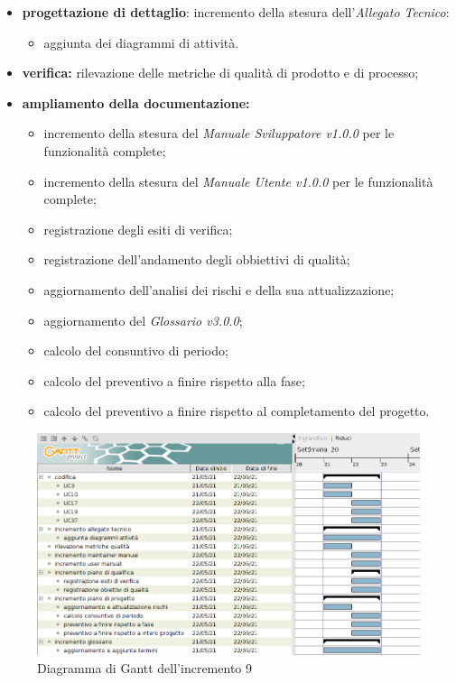 \begin{itemize}
\begin{itemize}
\begin{itemize}
                    \end{itemize}
          \end{itemize}
    \item \textbf{progettazione di dettaglio}: incremento della stesura dell'\textit{Allegato Tecnico}:
          \begin{itemize}
              \item aggiunta dei diagrammi di attività.
          \end{itemize}
    \item \textbf{verifica:} rilevazione delle metriche di qualità di prodotto e di processo;
    \item \textbf{ampliamento della documentazione:}
          \begin{itemize}
              \item incremento della stesura del \textit{Manuale Sviluppatore v1.0.0} per le funzionalità complete;
              \item incremento della stesura del \textit{Manuale Utente v1.0.0} per le funzionalità complete;
              \item registrazione degli esiti di verifica;
              \item registrazione dell'andamento degli obbiettivi di qualità;
              \item aggiornamento dell'analisi dei rischi e della sua attualizzazione;
              \item aggiornamento del \textit{Glossario v3.0.0};
              \item calcolo del consuntivo di periodo;
              \item calcolo del preventivo a finire rispetto alla fase;
              \item calcolo del preventivo a finire rispetto al completamento del progetto.
          \end{itemize}
\end{itemize}
\begin{figure}[!ht]
    \caption{Diagramma di Gantt dell'incremento 9}
    \vspace{5px}
    \includegraphics[scale=0.3]{../../../Images/Diagrammi/Gantt/incremento9.png}
    \centering
\end{figure}

